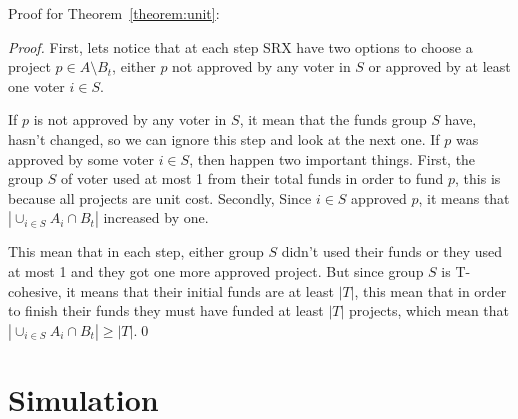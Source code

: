 \documentclass[runningheads]{llncs}
\begin{document}
\begin{subappendices}



Proof for Theorem~\ref{theorem:unit}:

\begin{proof}
First, lets notice that at each step SRX have two options to choose a project $p\in A\setminus B_t$, either $p$ not approved by any voter in $S$ or approved by at least one voter $i\in S$.

If $p$ is  not approved by any voter in $S$, it mean that the funds group $S$ have, hasn't changed, so we can ignore this step and look at the next one. If $p$ was approved by some voter $i\in S$, then happen two important things. First, the group $S$ of voter used at most 1 from their total funds in order to fund $p$, this is because all projects are unit cost. Secondly, Since $i\in S$ approved $p$, it means that $|\cup_{i\in S}A_i\cap B_t|$ increased by one.

This mean that in each step, either group $S$ didn't used their funds or they used at most 1 and they got one more approved project. But since group $S$ is T-cohesive, it means that their initial funds are at least $|T|$, this mean that in order to finish their funds they must have funded at least $|T|$ projects, which mean that $|\cup_{i\in S}A_i\cap B_t|\geq |T|$.\qed
\end{proof}

\section{Simulation}\label{app:sim}




\end{subappendices}
\end{document}
